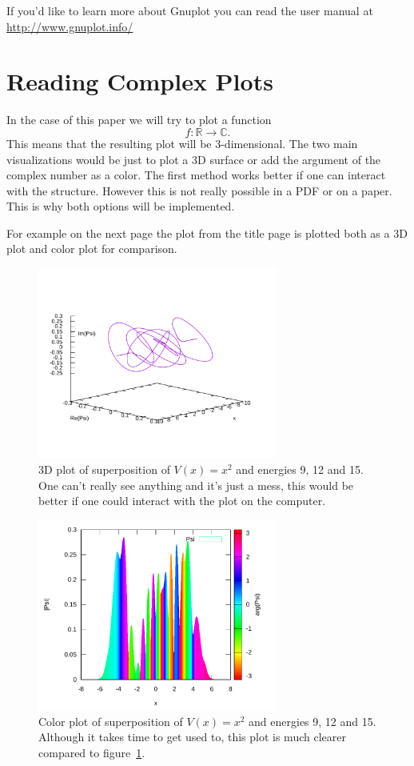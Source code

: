 \documentclass[11pt,DIV=10,final]{scrreprt} %
\begin{document}
If you'd like to learn more about Gnuplot you can read the user manual at \url{http://www.gnuplot.info/}

\section{Reading Complex Plots}\label{sec:complex-color-plots}
In the case of this paper we will try to plot a function
\[
  f: \mathbb{R} \to \mathbb{C}.
\]
This means that the resulting plot will be 3-dimensional. The two main visualizations would be just to plot a 3D surface or add the argument of the complex number as a color.
The first method works better if one can interact with the structure. However this is not really possible in a PDF or on a paper. This is why both options will be implemented.

For example on the next page the plot from the title page is plotted both as a 3D plot and color plot for comparison.
\begin{figure}[H]
  \centering
  \includegraphics[width=0.7\textwidth]{plots/super-square-9-12-15-3d.pdf}
  \caption{3D plot of superposition of $V(x) = x^2$ and energies 9, 12 and 15. One can't really see anything and it's just a mess, this would be better if one could interact with the plot
  on the computer.}\label{fig:title-wave-3d}
\end{figure}
\begin{figure}[H]
  \centering
  \includegraphics[width=0.7\textwidth]{plots/super-square-9-12-15-color.pdf}
  \caption{Color plot of superposition of $V(x) = x^2$ and energies 9, 12 and 15. Although it takes time to get used to, this plot is much clearer compared to figure~\ref{fig:title-wave-3d}.}
\end{figure}
\end{document}
